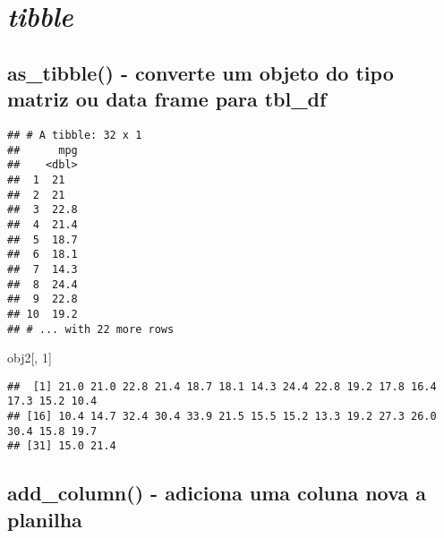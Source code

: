 \documentclass[]{book}
\newenvironment{Shaded}{\begin{snugshade}}{\end{snugshade}}
\newcommand{\CommentTok}[1]{\textcolor[rgb]{0.56,0.35,0.01}{\textit{#1}}}
\newcommand{\DecValTok}[1]{\textcolor[rgb]{0.00,0.00,0.81}{#1}}
\newcommand{\KeywordTok}[1]{\textcolor[rgb]{0.13,0.29,0.53}{\textbf{#1}}}
\newcommand{\NormalTok}[1]{#1}
\newcommand{\OperatorTok}[1]{\textcolor[rgb]{0.81,0.36,0.00}{\textbf{#1}}}
\newcommand{\StringTok}[1]{\textcolor[rgb]{0.31,0.60,0.02}{#1}}
\begin{document}
\hypertarget{tibble}{%
\chapter{\texorpdfstring{\emph{tibble}}{tibble}}\label{tibble}}

\hypertarget{as_tibble---converte-um-objeto-do-tipo-matriz-ou-data-frame-para-tbl_df}{%
\section{as\_tibble() - converte um objeto do tipo matriz ou data frame para tbl\_df}\label{as_tibble---converte-um-objeto-do-tipo-matriz-ou-data-frame-para-tbl_df}}

\begin{Shaded}
\end{Shaded}

\begin{verbatim}
## # A tibble: 32 x 1
##      mpg
##    <dbl>
##  1  21  
##  2  21  
##  3  22.8
##  4  21.4
##  5  18.7
##  6  18.1
##  7  14.3
##  8  24.4
##  9  22.8
## 10  19.2
## # ... with 22 more rows
\end{verbatim}

\begin{Shaded}
\begin{Highlighting}[]
\NormalTok{obj2[, }\DecValTok{1}\NormalTok{]}
\end{Highlighting}
\end{Shaded}

\begin{verbatim}
##  [1] 21.0 21.0 22.8 21.4 18.7 18.1 14.3 24.4 22.8 19.2 17.8 16.4 17.3 15.2 10.4
## [16] 10.4 14.7 32.4 30.4 33.9 21.5 15.5 15.2 13.3 19.2 27.3 26.0 30.4 15.8 19.7
## [31] 15.0 21.4
\end{verbatim}

\hypertarget{add_column---adiciona-uma-coluna-nova-a-planilha}{%
\section{add\_column() - adiciona uma coluna nova a planilha}\label{add_column---adiciona-uma-coluna-nova-a-planilha}}
\end{document}
